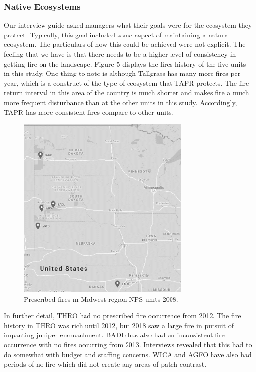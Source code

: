 \hypertarget{native-ecosystems}{%
\subsubsection{Native Ecosystems} \label{native-ecosystems}}

Our interview guide asked managers what their goals were for the ecosystem they protect. 
Typically, this goal included some aspect of
maintaining a natural ecosystem. 
The particulars of how this could be achieved were not explicit. The feeling
that we have is that there needs to be a higher level of consistency in
getting fire on the landscape. Figure 5 displays the fires history of
the five units in this study. One thing to note is although Tallgrass
has many more fires per year, which is a construct of the type of
ecosystem that TAPR protects. The fire return interval in this area of
the country is much shorter and makes fire a much more frequent
disturbance than at the other units in this study. Accordingly, TAPR has
more consistent fires compare to other units.

\begin{figure}[th]
	\centering
	\includegraphics[width=0.75\textwidth]{figures/RegionMapGoogle.png}\caption[Rx fires in Midwest NPS units, 2008.]{Prescribed fires in Midwest region NPS units 2008.} \label{RxFires}
\end{figure}

In further detail, THRO had no prescribed fire occurrence from 2012. 
The fire history in THRO was rich until 2012, but 2018 saw a large fire in pursuit of impacting juniper encroachment. 
BADL has also had an inconsistent fire occurrence with no fires occurring from 2013. 
Interviews revealed that this had to do somewhat with budget and staffing concerns. 
WICA and AGFO have also had periods of no fire which did not create any areas of patch contrast.

